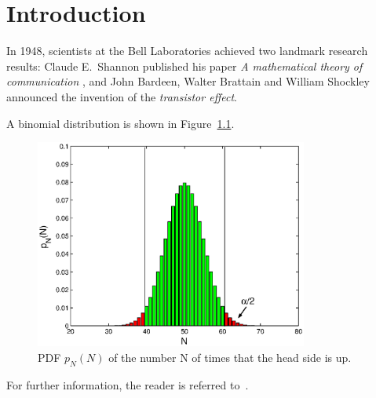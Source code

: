 \chapter{Introduction} \label{chap:introduction}

In 1948, scientists at the Bell Laboratories achieved two landmark research results:
Claude E.~Shannon published his paper \emph{A mathematical theory of communication} \cite{Shannon}, and John Bardeen, Walter Brattain and William Shockley announced the invention of the \emph{transistor effect}.

A binomial distribution is shown in Figure~\ref{fig:coin_bino}.

\begin{figure}[!htb]
    \centering
    \includegraphics[width=0.8\textwidth]{./figures/coin_bino.eps}
    \caption{PDF $p_N(N)$ of the number N of times that the head side is up.}
    \label{fig:coin_bino}
\end{figure}

For further information, the reader is referred to~\cite{Cover, Clayton, Sachs92, Paninski03, Berrou, Chechik03, Onkamo, SourceCoding, DeltaFunction}.


\clearpage
